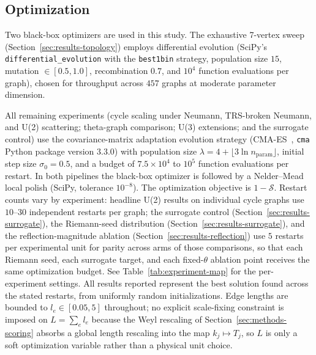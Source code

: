 \documentclass[cntp]{ipart}
\theoremstyle{plain}
\theoremstyle{remark}
\begin{document}
\subsection{Optimization}
\label{sec:methods-opt}

{\sloppy Two black-box optimizers are used in this study. The exhaustive 7-vertex sweep (Section~\ref{sec:results-topology}) employs differential evolution (SciPy's \texttt{differential\_evolution} with the \texttt{best1bin} strategy, population size $15$, mutation $\in [0.5, 1.0]$, recombination $0.7$, and $10^4$ function evaluations per graph), chosen for throughput across $457$ graphs at moderate parameter dimension.\par} All remaining experiments (cycle scaling under Neumann, TRS-broken Neumann, and U(2) scattering; theta-graph comparison; U(3) extensions; and the surrogate control) use the covariance-matrix adaptation evolution strategy (CMA-ES~\cite{r11}, \texttt{cma} Python package version $3.3.0$) with population size $\lambda = 4 + \lfloor 3 \ln n_{\mathrm{param}} \rfloor$, initial step size $\sigma_0 = 0.5$, and a budget of $7.5 \times 10^4$ to $10^5$ function evaluations per restart. In both pipelines the black-box optimizer is followed by a Nelder--Mead local polish (SciPy, tolerance $10^{-8}$). The optimization objective is $1 - \mathcal{S}$. Restart counts vary by experiment: headline U(2) results on individual cycle graphs use $10$--$30$ independent restarts per graph; the surrogate control (Section~\ref{sec:results-surrogate}), the Riemann-seed distribution (Section~\ref{sec:results-surrogate}), and the reflection-magnitude ablation (Section~\ref{sec:results-reflection}) use $5$ restarts per experimental unit for parity across arms of those comparisons, so that each Riemann seed, each surrogate target, and each fixed-$\theta$ ablation point receives the same optimization budget. See Table~\ref{tab:experiment-map} for the per-experiment settings. All results reported represent the best solution found across the stated restarts, from uniformly random initializations. Edge lengths are bounded to $l_e \in [0.05, 5]$ throughout; no explicit scale-fixing constraint is imposed on $L = \sum_e l_e$ because the Weyl rescaling of Section~\ref{sec:methods-scoring} absorbs a global length rescaling into the map $k_j \mapsto T_j$, so $L$ is only a soft optimization variable rather than a physical unit choice.
\end{document}
